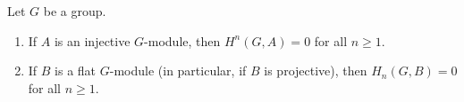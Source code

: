 Let $G$ be a group.
\begin{enumerate}
\item If $A$ is an injective $G$-module, then $H^n(G, A) = 0$ for all $n \geq 1$.
\item If $B$ is a flat $G$-module (in particular, if $B$ is projective), then $H_n(G, B) = 0$ for all $n \geq 1$.
\end{enumerate}
